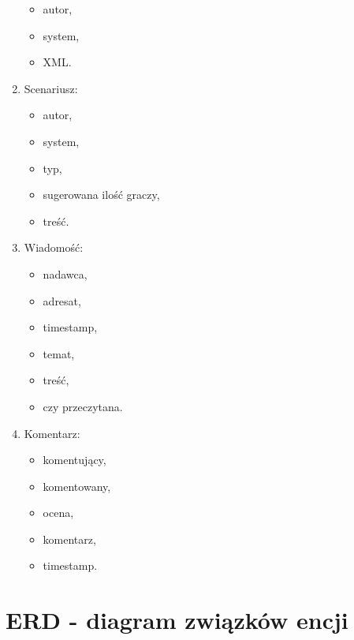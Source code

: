 \begin{enumerate}
\begin{itemize}
	\item autor,
	\item system,
	\item XML.
	\end{itemize}
\item Scenariusz:
	\begin{itemize}
	\item autor,
	\item system,
	\item typ,
	\item sugerowana ilość graczy,
	\item treść.
	\end{itemize}
\item Wiadomość:
	\begin{itemize}
	\item nadawca,
	\item adresat,
	\item timestamp,
	\item temat,
	\item treść,
	\item czy przeczytana.
	\end{itemize}
\item Komentarz:
	\begin{itemize}
	\item komentujący,
	\item komentowany,
	\item ocena,
	\item komentarz,
	\item timestamp.
	\end{itemize}
\end{enumerate}


\clearpage
\section{ERD - diagram związków encji}
\label{sec:ERD}

